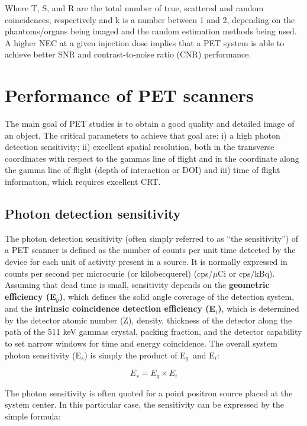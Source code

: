 \documentclass[review]{elsarticle}
\begin{document}
Where T, S, and R are the total number of true, scattered and random coincidences,
respectively and k is a number between 1 and 2, depending on the phantoms/organs being imaged
and the random estimation methods being used. A higher NEC at a given injection dose
implies that a PET system is able to achieve better SNR and contrast-to-noise ratio (CNR)
performance.

\section{Performance of PET scanners}
\label{sec.performance}

The main goal of PET studies is to obtain a good quality and detailed image of an object. The critical parameters to achieve that goal are: i) a high photon detection sensitivity; ii) excellent spatial resolution, both in the transverse coordinates with respect to the gammas line of flight and in the coordinate along the gamma line of flight (depth of interaction or DOI) and iii) time of flight information, which requires excellent CRT. 

\subsection*{Photon detection sensitivity}

The photon detection sensitivity (often simply referred to as ``the sensitivity'') of a PET scanner is defined as the number of counts per unit time detected by the device for each unit of activity present in a source. It is normally expressed in counts per second per microcurie (or kilobecquerel) (cps/$\mu$Ci or cps/kBq). 
Assuming that dead time is small, sensitivity depends on the 
{\bf geometric efficiency (E$_g$)}, which defines the solid angle coverage of the detection system, and the {\bf intrinsic coincidence detection efficiency (E$_i$)},
which is determined by the detector atomic
number (Z), density, thickness of the detector along the path of the 511 keV gammas crystal, packing fraction, and the detector capability to set narrow windows for time and energy coincidence. The overall system
photon sensitivity (E$_s$) is simply the product of E$_g$~and E$_i$:

%
\begin{equation}
E_s = E_g \times E_i
\label{eq.gsensi}
\end{equation}

The photon sensitivity is often quoted for a
point positron source placed at the system center. In this particular case, the sensitivity can be expressed by the simple formula:
\end{document}
